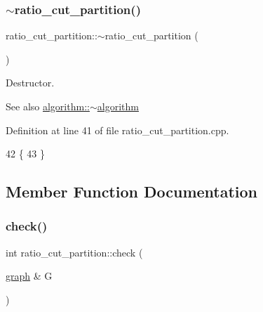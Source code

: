 \subsubsection{\texorpdfstring{$\sim$ratio\+\_\+cut\+\_\+partition()}{~ratio\_cut\_partition()}}
{\footnotesize\ttfamily ratio\+\_\+cut\+\_\+partition\+::$\sim$ratio\+\_\+cut\+\_\+partition (\begin{DoxyParamCaption}{ }\end{DoxyParamCaption})\hspace{0.3cm}{\ttfamily [virtual]}}

Destructor.

\begin{DoxySeeAlso}{See also}
\mbox{\hyperlink{classalgorithm_adca9b1e7fa3afd914519a9dbb44e9fd5}{algorithm\+::$\sim$algorithm}} 
\end{DoxySeeAlso}


Definition at line 41 of file ratio\+\_\+cut\+\_\+partition.\+cpp.


\begin{DoxyCode}
42 \{
43 \}
\end{DoxyCode}


\subsection{Member Function Documentation}
\mbox{\label{classratio__cut__partition_a469c613c69db19cb63e492075346fea2}} 
\subsubsection{\texorpdfstring{check()}{check()}}
{\footnotesize\ttfamily int ratio\+\_\+cut\+\_\+partition\+::check (\begin{DoxyParamCaption}\item[{\mbox{\hyperlink{classgraph}{graph}} \&}]{G }\end{DoxyParamCaption})\hspace{0.3cm}{\ttfamily [virtual]}}

